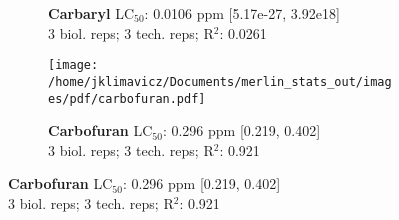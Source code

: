 \documentclass{article}
\begin{document}
\begin{figure}[thp!]
\begin{subfigure}{0.500\textwidth}
      \vspace{-0.05cm}
      \caption*{\textbf{Carbaryl} LC$_{50}$: 0.0106 ppm [5.17e-27, 3.92e18] \\ 
3 biol. reps; 3 tech. reps; R$^2$: 0.0261}
      \vspace{0.1cm}
   \end{subfigure}%
   \begin{subfigure}{0.500\textwidth}
      \centering
      \texttt{[image: /home/jklimavicz/Documents/merlin\_stats\_out/images/pdf/carbofuran.pdf]}
      \vspace{-0.05cm}
      \caption*{\textbf{Carbofuran} LC$_{50}$: 0.296 ppm [0.219, 0.402] \\ 
3 biol. reps; 3 tech. reps; R$^2$: 0.921}
      \vspace{0.1cm}
   \end{subfigure}%
\end{figure}
\clearpage
\pagebreak
\vspace{-0.1cm}
\end{document}
